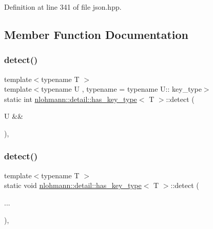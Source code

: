 Definition at line 341 of file json.\+hpp.



\subsection{Member Function Documentation}
\mbox{\label{structnlohmann_1_1detail_1_1has__key__type_a8387ce16ab3d7c83665265e5d244ccca}} 
\subsubsection{\texorpdfstring{detect()}{detect()}\hspace{0.1cm}{\footnotesize\ttfamily [1/2]}}
{\footnotesize\ttfamily template$<$typename T $>$ \\
template$<$typename U , typename  = typename U\+:: key\+\_\+type$>$ \\
static int \hyperlink{structnlohmann_1_1detail_1_1has__key__type}{nlohmann\+::detail\+::has\+\_\+key\+\_\+type}$<$ T $>$\+::detect (\begin{DoxyParamCaption}\item[{U \&\&}]{ }\end{DoxyParamCaption})\hspace{0.3cm}{\ttfamily [static]}, {\ttfamily [private]}}

\mbox{\label{structnlohmann_1_1detail_1_1has__key__type_a746958442705204d29bca2ecf9414282}} 
\subsubsection{\texorpdfstring{detect()}{detect()}\hspace{0.1cm}{\footnotesize\ttfamily [2/2]}}
{\footnotesize\ttfamily template$<$typename T $>$ \\
static void \hyperlink{structnlohmann_1_1detail_1_1has__key__type}{nlohmann\+::detail\+::has\+\_\+key\+\_\+type}$<$ T $>$\+::detect (\begin{DoxyParamCaption}\item[{}]{... }\end{DoxyParamCaption})\hspace{0.3cm}{\ttfamily [static]}, {\ttfamily [private]}}



